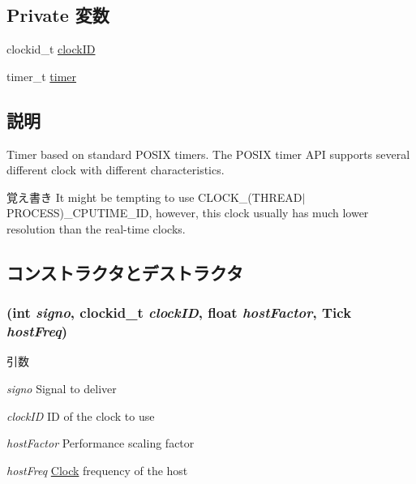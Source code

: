 \subsection*{Private 変数}
\begin{DoxyCompactItemize}
\item 
clockid\_\-t \hyperlink{classPosixKvmTimer_a3ad1d5e961d76190ddbf7559f642a11e}{clockID}
\item 
timer\_\-t \hyperlink{classPosixKvmTimer_a1a1e2de3a80567484c9b4d4f20d5a3d0}{timer}
\end{DoxyCompactItemize}


\subsection{説明}
Timer based on standard POSIX timers. The POSIX timer API supports several different clock with different characteristics.

\begin{DoxyNote}{覚え書き}
It might be tempting to use CLOCK\_\-(THREAD$|$PROCESS)\_\-CPUTIME\_\-ID, however, this clock usually has much lower resolution than the real-\/time clocks. 
\end{DoxyNote}


\subsection{コンストラクタとデストラクタ}
\hypertarget{classPosixKvmTimer_a8de164097b5374e298ea92b3e23c1951}{
\subsubsection[{PosixKvmTimer}]{ (int {\em signo}, \/  clockid\_\-t {\em clockID}, \/  float {\em hostFactor}, \/  {\bf Tick} {\em hostFreq})}}
\label{classPosixKvmTimer_a8de164097b5374e298ea92b3e23c1951}

\begin{DoxyParams}{引数}
\item[{\em signo}]Signal to deliver \item[{\em clockID}]ID of the clock to use \item[{\em hostFactor}]Performance scaling factor \item[{\em hostFreq}]\hyperlink{classClock}{Clock} frequency of the host \end{DoxyParams}



